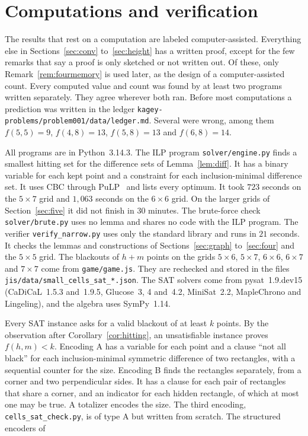 \section{Computations and verification}\label{sec:verify}

The results that rest on a computation are labeled computer-assisted. Everything else in
Sections~\ref{sec:conv} to~\ref{sec:height} has a written proof, except for the few remarks
that say a proof is only sketched or not written out. Of these, only
Remark~\ref{rem:fourmemory} is used later, as the design of a computer-assisted count. Every computed value and count
was found by at least two programs written separately. They agree wherever both ran. Before
most computations a prediction was written in the ledger
\nolinkurl{kagey-problems/problem001/data/ledger.md}. Several were wrong, among them
$f(5,5)=9$, $f(4,8)=13$, $f(5,8)=13$ and $f(6,8)=14$.

All programs are in Python~3.14.3. The ILP program \texttt{solver/engine.py} finds a smallest
hitting set for the difference sets of Lemma~\ref{lem:diff}. It has a binary variable for each
kept point and a constraint for each inclusion-minimal difference set. It uses CBC through
PuLP~\cite{pulp} and lists every optimum. It took $723$ seconds on the $5\times7$ grid and
$1{,}063$ seconds on the $6\times6$ grid. On the larger grids of Section~\ref{sec:five} it did
not finish in $30$ minutes. The brute-force check \texttt{solver/brute.py} uses no lemma and
shares no code with the ILP program. The verifier \texttt{verify\_narrow.py} uses only the
standard library and runs in $21$ seconds. It checks the lemmas and constructions of
Sections~\ref{sec:graph} to~\ref{sec:four} and the $5\times5$ grid. The blackouts of $h+m$
points on the grids $5\times6$, $5\times7$, $6\times6$, $6\times7$ and $7\times7$ come from
\nolinkurl{game/game.js}. They are rechecked and stored in the files
\nolinkurl{jis/data/small_cells_sat_*.json}. The SAT solvers come from pysat~1.9.dev15
(CaDiCaL~1.5.3 and~1.9.5, Glucose~3, 4 and~4.2, MiniSat~2.2, MapleChrono and Lingeling), and
the algebra uses SymPy~1.14.

Every SAT instance asks for a valid blackout of at least $k$ points. By the observation after
Corollary~\ref{cor:hitting}, an
 unsatisfiable instance proves $f(h,m)<k$. Encoding A has a
variable for each point and a clause ``not all black'' for each inclusion-minimal symmetric
difference of two rectangles, with a sequential counter for the size. Encoding B finds
the rectangles separately, from a corner and two perpendicular sides. It has a clause for
each pair of rectangles that share a corner, and an indicator for each hidden rectangle, of
which at most one may be true. A totalizer encodes the size. The third encoding,
\texttt{cells\_sat\_check.py}, is of type A but written from scratch. The structured encoders of

